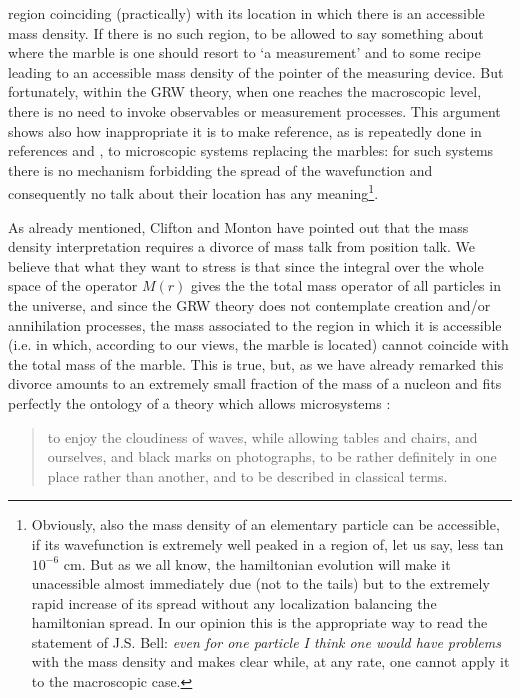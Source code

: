 \documentclass[12pt]{article}
\begin{document}
\begin{enumerate}
region coinciding (practically) with its location in which there
is an accessible mass density. If there is no such region, to be
allowed to say something about where the marble is one should
resort to `a measurement' and to some recipe leading to an
accessible mass density of the pointer of the measuring device.
But fortunately, within the GRW theory, when one reaches the
macroscopic level, there is no need to  invoke  observables or
measurement processes. This argument shows also how inappropriate
it is to make reference, as is repeatedly done in references
\cite{cli1} and \cite{cli2}, to microscopic systems replacing the
marbles: for such systems there is no mechanism forbidding the
spread of the wavefunction and consequently no talk about their
location has any meaning\footnote{Obviously, also the mass density
of an elementary particle can be accessible, if its wavefunction
is extremely well peaked in a region of, let us say, less tan
$10^{-6}$ cm. But as we all know, the hamiltonian evolution will
make it unacessible almost immediately due (not to the tails) but
to the extremely rapid increase of its spread without any
localization balancing  the hamiltonian spread. In our opinion this is
the appropriate way to read the statement of J.S. Bell: {\it
even for one particle I think one would have problems }with the mass
density and makes clear while, at any rate, one cannot  apply it to the
macroscopic case.}.
\end{enumerate}

As already mentioned, Clifton and Monton have pointed out that the
mass density interpretation requires a divorce of mass talk from
position talk.  We believe that what they want to stress is that
since the integral over the whole space of the operator $M(r)$
gives the the total mass operator of all particles in the
universe, and since the GRW theory does not contemplate creation
and/or annihilation processes, the mass associated to the region
in which it is accessible (i.e. in which, according to our views,
the marble is located) cannot coincide with the total mass of the
marble. This is true, but, as we have already remarked this
divorce amounts to an extremely small fraction of the mass of a
nucleon and fits perfectly the ontology of a theory which allows
microsystems \cite{bellns}:
\begin{quotation}
to enjoy the cloudiness of waves, while allowing tables and
chairs, and ourselves, and black marks on photographs, to be
rather definitely in one place rather than another, and to be
described in classical terms.
\end{quotation}
\end{document}
